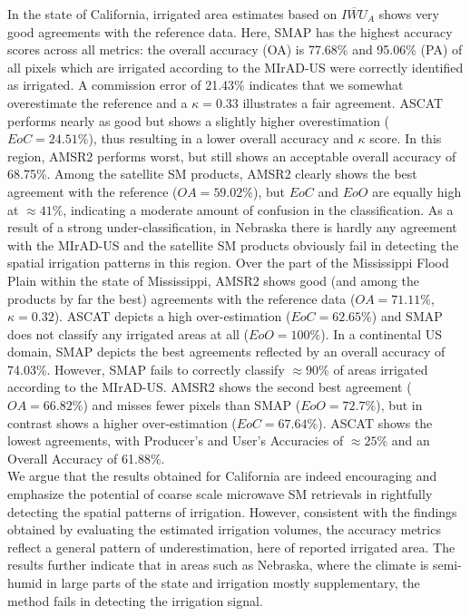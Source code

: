 \documentclass[hess, manuscript]{copernicus}
\begin{document}
In the state of California, irrigated area estimates based on $\overline{IWU}_{A}$ shows very good agreements with the reference data. Here, SMAP has the highest accuracy scores across all metrics: the overall accuracy (OA) is 77.68\% and 95.06\% (PA) of all pixels which are irrigated according to the MIrAD-US were correctly identified as irrigated. A commission error of 21.43\% indicates that we somewhat overestimate the reference and a $\kappa = 0.33$ illustrates a fair agreement. ASCAT performs nearly as good but shows a slightly higher overestimation ($EoC=24.51\%$), thus resulting in a lower overall accuracy and $\kappa$ score. In this region, AMSR2 performs worst, but still shows an acceptable overall accuracy of 68.75\%. Among the satellite SM products, AMSR2 clearly shows the best agreement with the reference ($OA=59.02\%$), but $EoC$ and $EoO$ are equally high at $\approx 41\%$, indicating a moderate amount of confusion in the classification. As a result of a strong under-classification, in Nebraska there is hardly any agreement with the MIrAD-US and the satellite SM products obviously fail in detecting the spatial irrigation patterns in this region. Over the part of the Mississippi Flood Plain within the state of Mississippi, AMSR2 shows good (and among the products by far the best) agreements with the reference data ($OA=71.11\%$, $\kappa=0.32$). ASCAT depicts a high over-estimation ($EoC=62.65\%$) and SMAP does not classify any irrigated areas at all ($EoO=100\%$). In a continental US domain, SMAP depicts the best agreements reflected by an overall accuracy of 74.03\%. However, SMAP fails to correctly classify $\approx 90\%$ of areas irrigated according to the MIrAD-US. AMSR2 shows the second best agreement ($OA=66.82\%$) and misses fewer pixels than SMAP ($EoO=72.7\%$), but in contrast shows a higher over-estimation ($EoC=67.64\%$). ASCAT shows the lowest agreements, with Producer's and User's Accuracies of $\approx 25\%$ and an Overall Accuracy of 61.88\%.\\

We argue that the results obtained for California are indeed encouraging and emphasize the potential of coarse scale microwave SM retrievals in rightfully detecting the spatial patterns of irrigation. However, consistent with the findings obtained by evaluating the estimated irrigation volumes, the accuracy metrics reflect a general pattern of underestimation, here of reported irrigated area. The results further indicate that in areas such as Nebraska, where the climate is semi-humid in large parts of the state and irrigation mostly supplementary, the method fails in detecting the irrigation signal.
\end{document}
